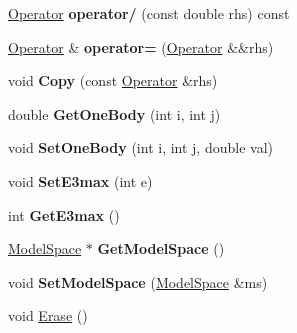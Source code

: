 \begin{DoxyCompactItemize}
\item 
\hypertarget{classOperator_a60c6e3fa8da186a1183e540e6ff04421}{\hyperlink{classOperator}{Operator} {\bfseries operator/} (const double rhs) const }\label{classOperator_a60c6e3fa8da186a1183e540e6ff04421}

\item 
\hypertarget{classOperator_ab1d24f45c7e10139e41084c8dc7f34ec}{\hyperlink{classOperator}{Operator} \& {\bfseries operator=} (\hyperlink{classOperator}{Operator} \&\&rhs)}\label{classOperator_ab1d24f45c7e10139e41084c8dc7f34ec}

\item 
\hypertarget{classOperator_a851708e76dd24603d0527f6c5c1bd544}{void {\bfseries Copy} (const \hyperlink{classOperator}{Operator} \&rhs)}\label{classOperator_a851708e76dd24603d0527f6c5c1bd544}

\item 
\hypertarget{classOperator_a34eb5fa0e6d415cd44e1a3034d1cf5c0}{double {\bfseries Get\-One\-Body} (int i, int j)}\label{classOperator_a34eb5fa0e6d415cd44e1a3034d1cf5c0}

\item 
\hypertarget{classOperator_ae85aa3d8fdaeb3cb6266c3a4494e904b}{void {\bfseries Set\-One\-Body} (int i, int j, double val)}\label{classOperator_ae85aa3d8fdaeb3cb6266c3a4494e904b}

\item 
\hypertarget{classOperator_a8b32ed75e5e0d6175a2f2f517c63a89c}{void {\bfseries Set\-E3max} (int e)}\label{classOperator_a8b32ed75e5e0d6175a2f2f517c63a89c}

\item 
\hypertarget{classOperator_a42d67df774701e40e2c49e539a68c937}{int {\bfseries Get\-E3max} ()}\label{classOperator_a42d67df774701e40e2c49e539a68c937}

\item 
\hypertarget{classOperator_aeacbeb2efba4199ad20291b50f03f4f6}{\hyperlink{classModelSpace}{Model\-Space} $\ast$ {\bfseries Get\-Model\-Space} ()}\label{classOperator_aeacbeb2efba4199ad20291b50f03f4f6}

\item 
\hypertarget{classOperator_ade09f5e47031f285f10d7f4f8a5e0216}{void {\bfseries Set\-Model\-Space} (\hyperlink{classModelSpace}{Model\-Space} \&ms)}\label{classOperator_ade09f5e47031f285f10d7f4f8a5e0216}

\item 
\hypertarget{classOperator_a8a0f7d6aa5163929850d06b31dc24a55}{void \hyperlink{classOperator_a8a0f7d6aa5163929850d06b31dc24a55}{Erase} ()}\label{classOperator_a8a0f7d6aa5163929850d06b31dc24a55}


\end{DoxyCompactItemize}

